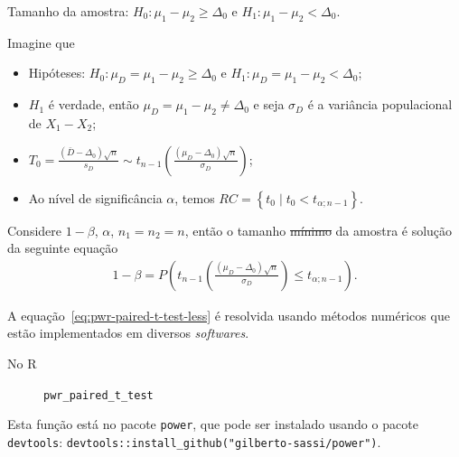 \documentclass[9pt]{beamer}
\begin{document}
\begin{frame}{Tamanho da amostra: $H_0:\mu_1 - \mu_2 \geq \Delta_0$ e $H_1: \mu_1 - \mu_2 < \Delta_0$.}

\normalsize
Imagine que
\begin{itemize}
	\item Hipóteses: $H_0:\mu_D= \mu_1 - \mu_2 \geq \Delta_0$ e $H_1:\mu_D= \mu_1 -  \mu_2 < \Delta_0$;
	\item $H_1$ é verdade, então $\mu_D = \mu_1-\mu_2 \neq \Delta_0$ e seja $\sigma_D$ é a variância populacional de $X_1 - X_2$;
	\item $T_0 = \frac{(\bar{D} - \Delta_0)\sqrt{n}}{s_D} \sim t_{n-1}\left( \frac{(\mu_D - \Delta_0)\sqrt{n}}{\sigma_D} \right)$;
	\item Ao nível de significância $\alpha$, temos $RC = \left\{ t_0 \mid t_0 < t_{\alpha;n-1}  \right\}$.
\end{itemize}
\vfill

Considere $1-\beta$, $\alpha$, $n_1=n_2=n$, então o tamanho \sout{mínimo} da amostra é solução da seguinte equação
\scriptsize
\begin{align}\label{eq:pwr-paired-t-test-less}
1-\beta = P\left( t_{n-1}\left( \frac{(\mu_D - \Delta_0)\sqrt{n}}{\sigma_D} \right) \leq t_{\alpha;n-1} \right).
\end{align}

A equação~\eqref{eq:pwr-paired-t-test-less} é resolvida usando métodos numéricos que estão implementados em diversos \textit{softwares}.
\begin{description}
	\item[No R] \lstinline|pwr_paired_t_test|
\end{description}
Esta função está no pacote \lstinline|power|, que pode ser instalado usando o pacote \lstinline|devtools|: \lstinline|devtools::install_github("gilberto-sassi/power")|.

\normalsize
\end{frame}
\end{document}
